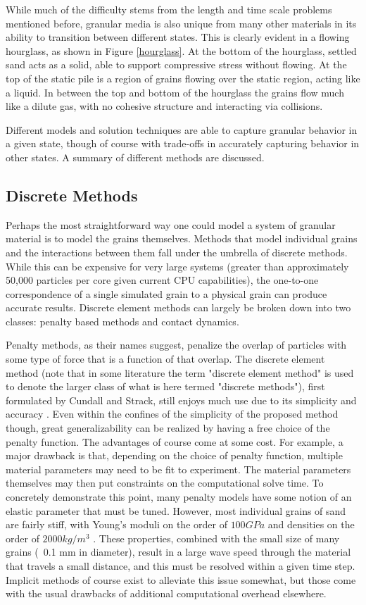 While much of the difficulty stems from the length and time scale problems mentioned before, granular media is also unique from many other materials in its ability to transition between different states. This is clearly evident in a flowing hourglass, as shown in Figure \ref{hourglass}. At the bottom of the hourglass, settled sand acts as a solid, able to support compressive stress without flowing. At the top of the static pile is a region of grains flowing over the static region, acting like a liquid. In between the top and bottom of the hourglass the grains flow much like a dilute gas, with no cohesive structure and interacting via collisions.

Different models and solution techniques are able to capture granular behavior in a given state, though of course with trade-offs in accurately capturing behavior in other states. A summary of different methods are discussed. 

\subsection{Discrete Methods}
Perhaps the most straightforward way one could model a system of granular material is to model the grains themselves. Methods that model individual grains and the interactions between them fall under the umbrella of discrete methods. While this can be expensive for very large systems (greater than approximately 50,000 particles per core given current CPU capabilities), the one-to-one correspondence of a single simulated grain to a physical grain can produce accurate results. Discrete element methods can largely be broken down into two classes: penalty based methods and contact dynamics.

Penalty methods, as their names suggest, penalize the overlap of particles with some type of force that is a function of that overlap. The discrete element method (note that in some literature the term "discrete element method" is used to denote the larger class of what is here termed "discrete methods"), first formulated by Cundall and Strack, still enjoys much use due to its simplicity and accuracy \cite{Cundall:1979}. Even within the confines of the simplicity of the proposed method though, great generalizability can be realized by having a free choice of the penalty function. The advantages of course come at some cost. For example, a major drawback is that, depending on the choice of penalty function, multiple material parameters may need to be fit to experiment. The material parameters themselves may then put constraints on the computational solve time. To concretely demonstrate this point, many penalty models have some notion of an elastic parameter that must be tuned. However, most individual grains of sand are fairly stiff, with Young's moduli on the order of $100 GPa$ and densities on the order of $2000 kg/m^3$ \cite{Wang:2010}. These properties, combined with the small size of many grains (~0.1 mm in diameter), result in a large wave speed through the material that travels a small distance, and this must be resolved within a given time step. Implicit methods of course exist to alleviate this issue somewhat, but those come with the usual drawbacks of additional computational overhead elsewhere.

